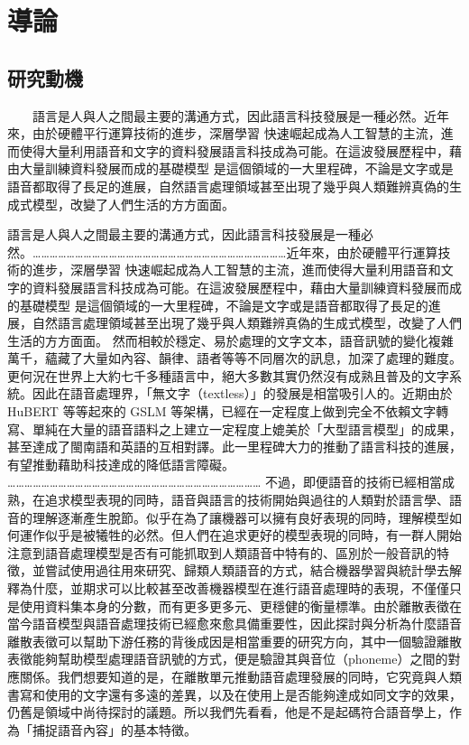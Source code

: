 
\chapter{導論}

\section{研究動機}
　　語言是人與人之間最主要的溝通方式，因此語言科技發展是一種必然。近年來，由於硬體平行運算技術的進步，深層學習 快速崛起成為人工智慧的主流，進而使得大量利用語音和文字的資料發展語言科技成為可能。在這波發展歷程中，藉由大量訓練資料發展而成的基礎模型 是這個領域的一大里程碑，不論是文字或是語音都取得了長足的進展，自然語言處理領域甚至出現了幾乎與人類難辨真偽的生成式模型，改變了人們生活的方方面面。

    語言是人與人之間最主要的溝通方式，因此語言科技發展是一種必然。………………………………………………………………………………近年來，由於硬體平行運算技術的進步，深層學習 快速崛起成為人工智慧的主流，進而使得大量利用語音和文字的資料發展語言科技成為可能。在這波發展歷程中，藉由大量訓練資料發展而成的基礎模型 是這個領域的一大里程碑，不論是文字或是語音都取得了長足的進展，自然語言處理領域甚至出現了幾乎與人類難辨真偽的生成式模型，改變了人們生活的方方面面。
    然而相較於穩定、易於處理的文字文本，語音訊號的變化複雜萬千，蘊藏了大量如內容、韻律、語者等等不同層次的訊息，加深了處理的難度。更何況在世界上大約七千多種語言中，絕大多數其實仍然沒有成熟且普及的文字系統。因此在語音處理界，「無文字（textless）」的發展是相當吸引人的。近期由於 HuBERT 等等起來的 GSLM 等架構，已經在一定程度上做到完全不依賴文字轉寫、單純在大量的語音語料之上建立一定程度上媲美於「大型語言模型」的成果，甚至達成了閩南語和英語的互相對譯。此一里程碑大力的推動了語言科技的進展，有望推動藉助科技達成的降低語言障礙。
    ………………………………………………………………………………
    不過，即便語音的技術已經相當成熟，在追求模型表現的同時，語音與語言的技術開始與過往的人類對於語言學、語音的理解逐漸產生脫節。似乎在為了讓機器可以擁有良好表現的同時，理解模型如何運作似乎是被犧牲的必然。但人們在追求更好的模型表現的同時，有一群人開始注意到語音處理模型是否有可能抓取到人類語音中特有的、區別於一般音訊的特徵，並嘗試使用過往用來研究、歸類人類語音的方式，結合機器學習與統計學去解釋為什麼，並期求可以比較甚至改善機器模型在進行語音處理時的表現，不僅僅只是使用資料集本身的分數，而有更多更多元、更穩健的衡量標準。由於離散表徵在當今語音模型與語音處理技術已經愈來愈具備重要性，因此探討與分析為什麼語音離散表徵可以幫助下游任務的背後成因是相當重要的研究方向，其中一個驗證離散表徵能夠幫助模型處理語音訊號的方式，便是驗證其與音位（phoneme）之間的對應關係。我們想要知道的是，在離散單元推動語音處理發展的同時，它究竟與人類書寫和使用的文字還有多遠的差異，以及在使用上是否能夠達成如同文字的效果，仍舊是領域中尚待探討的議題。所以我們先看看，他是不是起碼符合語音學上，作為「捕捉語音內容」的基本特徵。



